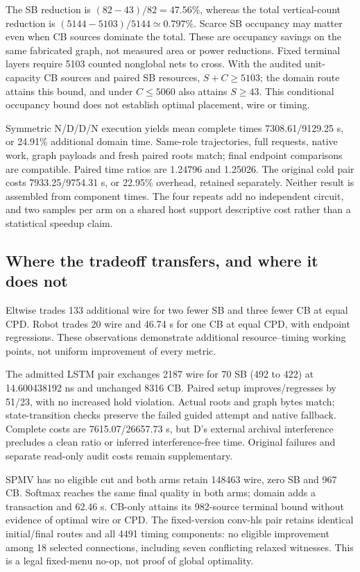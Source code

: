 \documentclass[conference,10pt]{IEEEtran}
\begin{document}
The SB reduction is $(82-43)/82=47.56\%$, whereas the total vertical-count reduction is $(5144-5103)/5144\simeq0.797\%$. Scarce SB occupancy may matter even when CB sources dominate the total. These are occupancy savings on the same fabricated graph, not measured area or power reductions. Fixed terminal layers require 5103 counted nonglobal nets to cross. With the audited unit-capacity CB sources and paired SB resources, $S+C\ge5103$; the domain route attains this bound, and under $C\le5060$ also attains $S\ge43$. This conditional occupancy bound does not establish optimal placement, wire or timing.

Symmetric N/D/D/N execution yields mean complete times 7308.61/9129.25 s, or 24.91\% additional domain time. Same-role trajectories, full requests, native work, graph payloads and fresh paired roots match; final endpoint comparisons are compatible. Paired time ratios are 1.24796 and 1.25026. The original cold pair costs 7933.25/9754.31 s, or 22.95\% overhead, retained separately. Neither result is assembled from component times. The four repeats add no independent circuit, and two samples per arm on a shared host support descriptive cost rather than a statistical speedup claim.

\subsection{Where the tradeoff transfers, and where it does not}
Eltwise trades 133 additional wire for two fewer SB and three fewer CB at equal CPD. Robot trades 20 wire and 46.74 s for one CB at equal CPD, with endpoint regressions. These observations demonstrate additional resource--timing working points, not uniform improvement of every metric.

The admitted LSTM pair exchanges 2187 wire for 70 SB (492 to 422) at 14.600438192 ns and unchanged 8316 CB. Paired setup improves/regresses by 51/23, with no increased hold violation. Actual roots and graph bytes match; state-transition checks preserve the failed guided attempt and native fallback. Complete costs are 7615.07/26657.73 s, but D's external archival interference precludes a clean ratio or inferred interference-free time. Original failures and separate read-only audit costs remain supplementary.

SPMV has no eligible cut and both arms retain 148463 wire, zero SB and 967 CB. Softmax reaches the same final quality in both arms; domain adds a transaction and 62.46 s. CB-only attains its 982-source terminal bound without evidence of optimal wire or CPD. The fixed-version conv-hls pair retains identical initial/final routes and all 4491 timing components: no eligible improvement among 18 selected connections, including seven conflicting relaxed witnesses. This is a legal fixed-menu no-op, not proof of global optimality.
\end{document}
